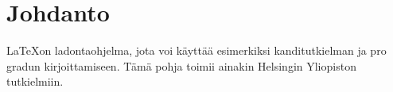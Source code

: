 \section{Johdanto}

\LaTeX on ladontaohjelma, jota voi käyttää esimerkiksi kanditutkielman ja
pro gradun kirjoittamiseen. Tämä pohja toimii ainakin Helsingin
Yliopiston tutkielmiin.
